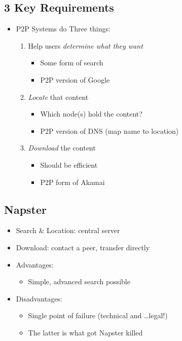 \subsection{3 Key Requirements}
\begin{itemize}[nosep]
    \item P2P Systems do Three things:
          \begin{enumerate}[nosep]
              \item Help users \emph{determine what they want}
                    \begin{itemize}[nosep]
                        \item Some form of search
                        \item P2P version of Google
                    \end{itemize}
              \item \emph{Locate} that content
                    \begin{itemize}[nosep]
                        \item Which node(s) hold the content?
                        \item P2P version of DNS (map name to location)
                    \end{itemize}
              \item \emph{Download} the content
                    \begin{itemize}[nosep]
                        \item Should be efficient
                        \item P2P form of Akamai
                    \end{itemize}
          \end{enumerate}
\end{itemize}
\subsection{Napster}
\begin{itemize}[nosep]
    \item Search \& Location: central server
    \item Download: contact a peer, transfer directly
    \item Advantages:
          \begin{itemize}[nosep]
              \item Simple, advanced search possible
          \end{itemize}
    \item Disadvantages:
          \begin{itemize}[nosep]
              \item Single point of failure (technical and \dots legal!)
              \item The latter is what got Napster killed
          \end{itemize}
\end{itemize}
